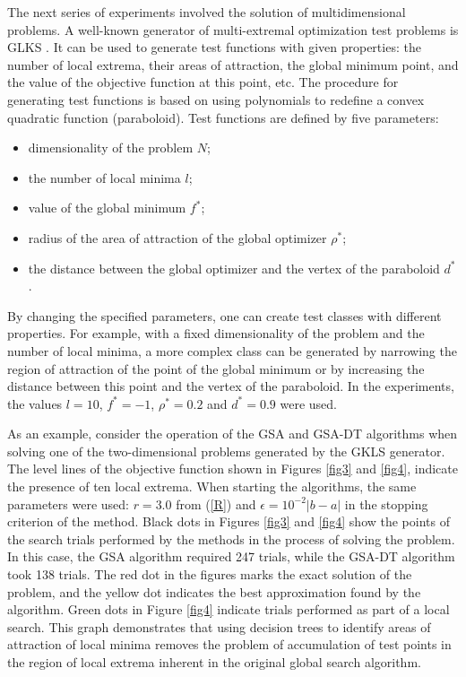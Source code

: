 \documentclass[entropy,article,submit,moreauthors,pdftex]{Definitions/mdpi}
\begin{document}
The next series of experiments involved the solution of multidimensional problems. 
A well-known generator of multi-extremal optimization test problems is GLKS  \cite{Gaviano2003}. It can be used to generate test functions with given properties: the number of local extrema, their areas of attraction, the global minimum point, and the value of the objective function at this point, etc. The procedure for generating test functions is based on using polynomials to redefine a convex quadratic function (paraboloid). Test functions are defined by five parameters:
\begin{itemize}
	\item dimensionality of the problem  $N$;
	\item the number of local minima $l$;
	\item value of the global minimum $f^*$;
	\item radius of the area of attraction of the global optimizer $\rho^*$;
	\item the distance between the global optimizer and the vertex of the paraboloid $d^*$.
\end{itemize}
By changing the specified parameters, one can create test classes with different properties. For example, with a fixed dimensionality of the problem and the number of local minima, a more complex class can be generated by narrowing the region of attraction of the point of the global minimum or by increasing the distance between this point and the vertex of the paraboloid. 
In the experiments, the values $l=10$, $f^*=-1$, $\rho^*=0.2$ and $d^*=0.9$ were used.


As an example, consider the operation of the GSA and GSA-DT algorithms when solving one of the two-dimensional problems generated by the GKLS generator. 
The level lines of the objective function shown in Figures \ref{fig3} and \ref{fig4}, indicate the presence of ten local extrema. 
When starting the algorithms, the same parameters were used:  $r=3.0$ from (\ref{R}) and $\epsilon = 10^{-2}\left|b-a\right|$ in the stopping criterion of the method. 
Black dots in Figures \ref{fig3} and \ref{fig4} show the points of the search trials performed by the methods in the process of solving the problem. In this case, the GSA algorithm required 247 trials, while the GSA-DT algorithm took 138 trials.
The red dot in the figures marks the exact solution of the problem, and the yellow dot indicates the best approximation found by the algorithm. 
Green dots in Figure \ref{fig4} indicate trials performed as part of a local search. 
This graph demonstrates that using decision trees to identify areas of attraction of local minima removes the problem of accumulation of test points in the region of local extrema inherent in the original global search algorithm.
\end{document}
